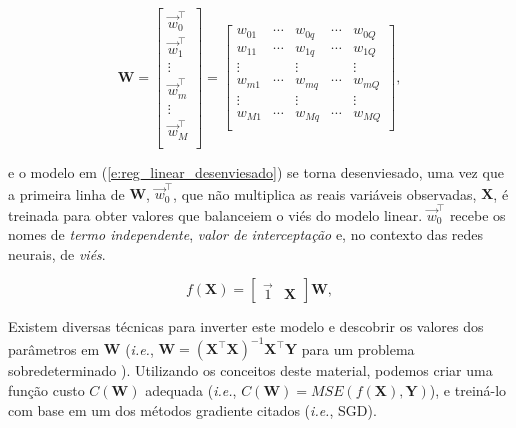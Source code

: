     \begin{equation} \label{e:reg_linear_W}
      \boldsymbol{W} =
      \begin{bmatrix}
        \vec{w}_{0}^\top \\
        \vec{w}_{1}^\top \\
        \vdots \\
        \vec{w}_{m}^\top \\
        \vdots \\
        \vec{w}_{M}^\top \\
      \end{bmatrix} =
      \begin{bmatrix}
        w_{01} & \cdots & w_{0q} & \cdots & w_{0Q} \\
        w_{11} & \cdots & w_{1q} & \cdots & w_{1Q} \\
        \vdots & & \vdots & & \vdots\\
        w_{m1} & \cdots & w_{mq} & \cdots & w_{mQ} \\
        \vdots & & \vdots & & \vdots\\
        w_{M1} & \cdots & w_{Mq} & \cdots & w_{MQ} \\
      \end{bmatrix}
      ,
    \end{equation}

    \noindent e o modelo em (\ref{e:reg_linear_desenviesado}) se torna desenviesado, uma vez que a primeira linha de $\boldsymbol{W}$, $\vec{w}_0^\top$, que não multiplica as reais variáveis observadas, $\boldsymbol{X}$, é treinada para obter valores que balanceiem o viés do modelo linear. $\vec{w}_0^\top$ recebe os nomes de \emph{termo independente}, \emph{valor de interceptação} e, no contexto das redes neurais, de \emph{viés}.

    \begin{equation} \label{e:reg_linear_desenviesado}
      f(\boldsymbol{X}) = \begin{bmatrix} \vec{1} & \boldsymbol{X} \end{bmatrix} \boldsymbol{W}
      ,
    \end{equation}

    Existem diversas técnicas para inverter este modelo e descobrir os valores dos parâmetros em $\boldsymbol{W}$ (\textit{i.e.}, $\boldsymbol{W}=(\boldsymbol{X}^\top \boldsymbol{X})^{-1}\boldsymbol{X}^\top \boldsymbol{Y}$ para um problema sobredeterminado ). Utilizando os conceitos deste material, podemos criar uma função custo $C(\boldsymbol{W})$ adequada (\textit{i.e.}, $C(\boldsymbol{W}) = MSE(f(\boldsymbol{X}), \boldsymbol{Y})$), e treiná-lo com base em um dos métodos gradiente citados (\textit{i.e.}, SGD).

